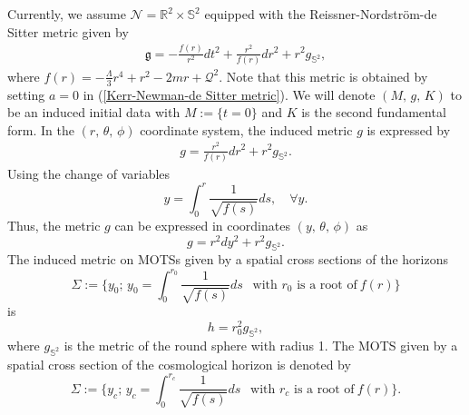 \documentclass[a4paper, 11pt, reqno]{amsart}
\begin{document}
Currently, we assume $\mathcal{N}=\mathbb{R}^2\times\mathbb{S}^2$ equipped with the Reissner-Nordstr\"om-de Sitter metric given by
\begin{eqnarray*}
        \mathfrak{g}=-\frac{f(r)}{r^2}dt^2+\frac{r^2}{f(r)}dr^2+r^2g_{\mathbb{S}^2},
    \end{eqnarray*}
where $f(r)=-\frac{\Lambda}{3}r^4+r^2-2mr+\mathcal{Q}^2.$ Note that this metric is obtained by setting $a=0$ in (\ref{Kerr-Newman-de Sitter metric}). We will denote $(M,\,g,\, K)$ to be an induced initial data with $M:=\{t=0\}$ and $K$ is the second fundamental form. In the $(r,\,\theta,\,\phi)$ coordinate system, the induced metric $g$ is expressed by 
\begin{eqnarray*}
    g=\frac{r^2}{f(r)}dr^2+r^2g_{\mathbb{S}^2}.
\end{eqnarray*}
Using the change of variables
\begin{equation*}
    y=\int_0^r\frac{1}{\sqrt{f(s)}}ds,\quad \forall y.
\end{equation*}
Thus, the metric $g$ can be expressed in coordinates $(y,\, \theta,\,\phi)$ as
\begin{equation*}
g=r^2dy^2+r^2g_{\mathbb{S}^2}.
\end{equation*}
The induced metric on MOTSs given by a spatial cross sections of the horizons
\begin{equation*}
\Sigma:=\Big\{y_0;\, y_0=\int_0^{r_0}\frac{1}{\sqrt{f(s)}}ds \ \ \mbox{ with $r_0$ is a root of}  \ f(r) \Big\}   
\end{equation*}
is 
\begin{equation}\label{conformal metric}
h=r_0^2g_{\mathbb{S}^2},
\end{equation}
 where $g_{\mathbb{S}^2}$ is the metric of the round sphere with radius 1. The MOTS given by a spatial cross section of the cosmological horizon is denoted by 
 \begin{equation}\label{cosmological MOTS}
 \Sigma:=\Big\{y_c;\, y_c=\int_0^{r_c}\frac{1}{\sqrt{f(s)}}ds \ \ \mbox{ with $r_c$ is a root of}  \ f(r) \Big\}.
   \end{equation}
\end{document}
